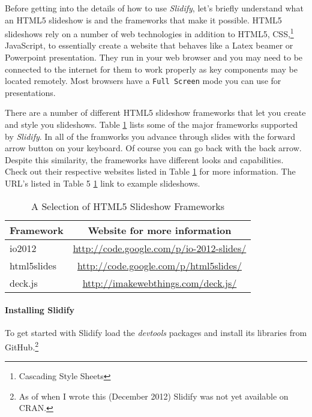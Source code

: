 Before getting into the details of how to use \emph{Slidify}, let's briefly understand what an HTML5 slideshow is and the frameworks that make it possible. HTML5 slideshows rely on a number of web technologies in addition to HTML5, CSS,\footnote{Cascading Style Sheets} JavaScript, to essentially create a website that behaves like a Latex beamer or Powerpoint presentation. They run in your web browser and you may need to be connected to the internet for them to work properly as key components may be located remotely. Most browsers have a \texttt{Full Screen} mode you can use for presentations. 

There are a number of different HTML5 slideshow frameworks that let you create and style you slideshows. Table \ref{SlideshowFrameworks} lists some of the major frameworks supported by \emph{Slidify}. In all of the framworks you advance through slides with the forward arrow button on your keyboard. Of course you can go back with the back arrow. Despite this similarity, the frameworks have different looks and capabilities. Check out their respective websites listed in Table \ref{SlideshowFrameworks} for more information. The URL's listed in Table 5 \ref{SlideshowFrameworks} link to example slideshows.

\begin{table}
	\caption{A Selection of HTML5 Slideshow Frameworks}
	\label{SlideshowFrameworks}
	\begin{center}
	\begin{tabular}{l c}
		\hline
		Framework & Website for more information \\[0.25cm]
		\hline\hline
		io2012 & \url{http://code.google.com/p/io-2012-slides/} \\[0.25cm]
		html5slides & \url{http://code.google.com/p/html5slides/} \\[0.25cm]
		deck.js &  \url{http://imakewebthings.com/deck.js/} \\[0.25cm]
		\hline
	\end{tabular}
	\end{center}
\end{table}

\paragraph{Installing Slidify}

To get started with Slidify load the \emph{devtools} packages and install its libraries from GitHub.\footnote{As of when I wrote this (December 2012) Slidify was not yet available on CRAN.}

